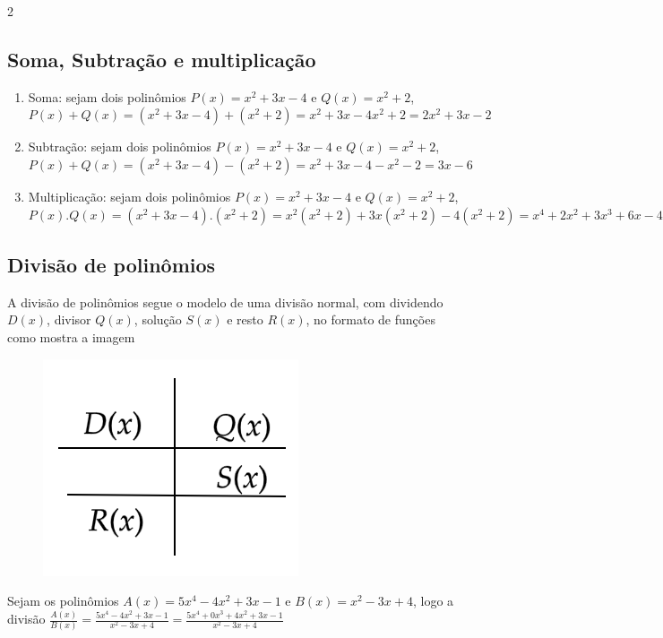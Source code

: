 \begin{multicols*}{2}
    \subsection{Soma, Subtração e multiplicação}
    \begin{enumerate}
        \item Soma: sejam dois polinômios $P(x) = x^2 + 3x - 4$ e $Q(x) = x^2 +2$,
              $P(x) + Q(x) = (x^2 + 3x - 4) + (x^2 +2) = x^2 +3x -4 x^2 +2 = 2x^2 + 3x -2$
        \item Subtração: sejam dois polinômios $P(x) = x^2 + 3x - 4$ e $Q(x) = x^2 +2$,
              $P(x) + Q(x) = (x^2 + 3x - 4) - (x^2 +2) = x^2 + 3x - 4 - x^2 - 2 = 3x - 6$
        \item Multiplicação: sejam dois polinômios $P(x) = x^2 + 3x - 4$ e $Q(x) = x^2 +2$,
              $P(x).Q(x) = (x^2 + 3x - 4).(x^2 +2) = x^2(x^2 +2) + 3x(x^2 +2) - 4(x^2 +2) =
                  x^4 + 2x^2 + 3x^3 + 6x - 4x^2 -8 = x^4 + 3x^3 - 2x^2 + 6x - 8$
    \end{enumerate}
    \subsection{Divisão de polinômios}
    A divisão de polinômios segue o modelo de uma divisão normal, com dividendo $D(x)$, divisor 			$Q(x)$, solução $S(x)$ e resto $R(x)$, no formato de funções como mostra a imagem
    \begin{figure}[H]
        \centering
        \includegraphics[scale=0.3]{assets/rafael/img21.png}
    \end{figure}

    Sejam os polinômios $A(x) = 5x^4 - 4x^2 + 3x - 1 $ e $B(x) = x^2 - 3x + 4$, logo a divisão
    $\frac{A(x)}{B(x)} = \frac{ 5x^4 - 4x^2 + 3x - 1 }{x^2 - 3x + 4} =
        \frac{ 5x^4 +0x^3 + 4x^2 + 3x - 1 }{x^2 - 3x + 4} $


\end{multicols*}
